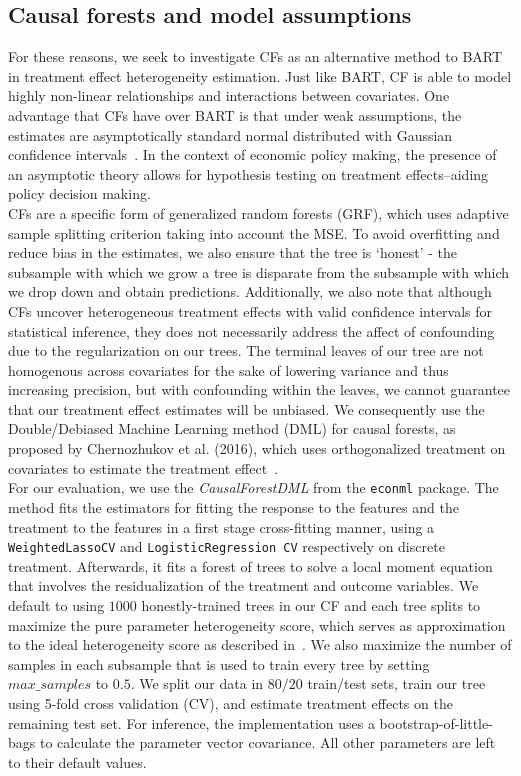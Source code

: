 \documentclass[12pt]{article}
\begin{document}
\subsection{Causal forests and model assumptions} 
For these reasons, we seek to investigate CFs as an alternative method to BART in
treatment effect heterogeneity estimation. Just like BART, CF is able to model
highly non-linear relationships and interactions between covariates. One
advantage that CFs have over BART is that under weak assumptions, the estimates
are asymptotically standard normal distributed with Gaussian confidence
intervals~\cite{atheywager2019}. In the context of economic policy making, the
presence of an asymptotic theory allows for hypothesis testing on treatment
effects--aiding policy decision making. \\

CFs are a specific form of generalized random forests (GRF), which
uses adaptive sample splitting criterion taking into account the MSE. To avoid
overfitting and reduce bias in the estimates, we also ensure that the tree is
`honest' - the subsample with which we grow a tree is disparate from the
subsample with which we drop down and obtain predictions. Additionally, we also
note that although CFs uncover heterogeneous treatment effects with
valid confidence intervals for statistical inference, they does not necessarily
address the affect of confounding due to the regularization on our trees. The
terminal leaves of our tree are not homogenous across covariates for the sake of
lowering variance and thus increasing precision, but with confounding within the
leaves, we cannot guarantee that our treatment effect estimates will be
unbiased. We consequently use the Double/Debiased Machine Learning method (DML) for
causal forests, as proposed by Chernozhukov et al. (2016), which uses orthogonalized
treatment on covariates to estimate the treatment effect~\cite{DML}. \\

For our evaluation, we use the \textit{CausalForestDML} from the \texttt{econml}
package. The method fits the estimators for fitting the response to the features
and the treatment to the features in a first stage cross-fitting manner, using a
\texttt{WeightedLassoCV} and \texttt{LogisticRegression CV} respectively on
discrete treatment. Afterwards, it fits a forest of trees to solve a local
moment equation that involves the residualization of the treatment and outcome
variables. We default to using $1000$ honestly-trained trees in our CF and each
tree splits to maximize the pure parameter heterogeneity score, which serves as
approximation to the ideal heterogeneity score as described
in~\cite{athey2018grf}. We also maximize the number of samples in each subsample
that is used to train every tree by setting $max\_samples$ to $0.5$. We split
our data in $80/20$ train/test sets, train our tree using 5-fold cross
validation (CV), and estimate treatment effects on the remaining test set. For
inference, the implementation uses a bootstrap-of-little-bags to calculate the
parameter vector covariance. All other parameters are left to their default
values. 
\end{document}

